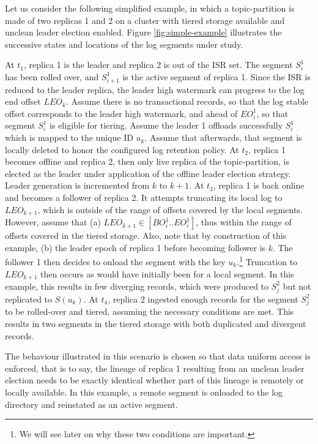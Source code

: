 \documentclass{article}
\begin{document}
Let us consider the following simplified example, in which a topic-partition is made of two replicas 1 and 2 on a cluster with tiered storage available and unclean leader election enabled. Figure \ref{fig:simple-example} illustrates the successive states and locations of the log segments under study.

\begin{outline}[enumerate]
	\1 At $t_1$, replica 1 is the leader and replica 2 is out of the ISR set. The segment $S_i^1$ has been rolled over, and $S_{i+1}^1$ is the active segment of replica 1. Since the ISR is reduced to the leader replica, the leader high watermark can progress to the log end offset $LEO_k$. Assume there is no transactional records, so that the log stable offset corresponds to the leader high watermark, and ahead of $EO_i^1$, so that segment $S_i^1$ is eligible for tiering. Assume the leader 1 offloads successfully $S_i^1$ which is mapped to the unique ID $u_k$. Assume that afterwards, that segment is locally deleted to honor the configured log retention policy.
	\1  At $t_2$, replica 1 becomes offline and replica 2, then only live replica of the topic-partition, is elected as the leader under application of the offline leader election strategy. Leader generation is incremented from $k$ to $k + 1$.
	\1  At $t_3$, replica 1 is back online and becomes a follower of replica 2. It attempts truncating its local log to $LEO_{k+1}$, which is outside of the range of offsets covered by the local segments. However, assume that (a) $LEO_{k+1} \in [BO_i^1..EO_i^1]$, thus within the range of offsets covered in the tiered storage. Also, note that by construction of this example, (b) the leader epoch of replica 1 before becoming follower is $k$. The follower 1 then decides to onload the segment with the key $u_k$.\footnote{We will see later on why these two conditions are important.} Truncation to $LEO_{k+1}$ then occurs as would have initially been for a local segment. In this example, this results in few diverging records, which were produced to $S_j^2$ but not replicated to $S(u_k)$.
	\1 At $t_4$, replica 2 ingested enough records for the segment $S_j^2$ to be rolled-over and tiered, assuming the necessary conditions are met. This results in two segments in the tiered storage with both duplicated and divergent records.
\end{outline}

The behaviour illustrated in this scenario is chosen so that data uniform access is enforced, that is to say, the lineage of replica 1 resulting from an unclean leader election needs to be exactly identical whether part of this lineage is remotely or locally available. In this example, a remote segment is onloaded to the log directory and reinstated as an active segment.
\end{document}
